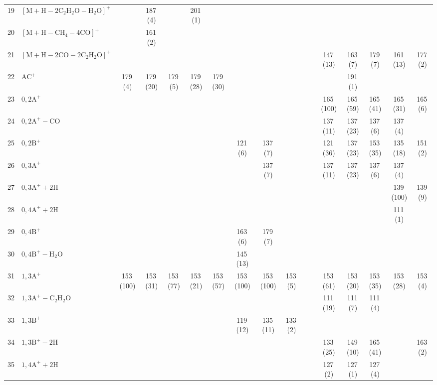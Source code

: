 \documentclass[]{article}
\begin{document}
\begin{table}
{\begin{tabular}{ll|ccccc|ccccc|ccccc}
  19 & $\mathrm{[M{+}H{-}2C_{2}H_{2}O{-}H_{2}O]^+}$ &  & 187\,(4) &  & 201\,(1) &  &  &  &  &  &  &  &  &  &  &  \\ 
  20 & $\mathrm{[M{+}H{-}CH_{4}{-}4CO]^+}$ &  & 161\,(2) &  &  &  &  &  &  &  &  &  &  &  &  &  \\ 
  21 & $\mathrm{[M{+}H{-}2CO{-}2C_{2}H_{2}O]^+}$ &  &  &  &  &  &  &  &  &  &  & 147\,(13) & 163\,(7) & 179\,(7) & 161\,(13) & 177\,(2) \\ 
  22 & $\mathrm{AC^+}$ & 179\,(4) & 179\,(20) & 179\,(5) & 179\,(28) & 179\,(30) &  &  &  &  &  &  & 191\,(1) &  &  &  \\ 
  23 & $\mathrm{0{,}2A^+}$ &  &  &  &  &  &  &  &  &  &  & 165\,(100) & 165\,(59) & 165\,(41) & 165\,(31) & 165\,(6) \\ 
  24 & $\mathrm{0{,}2A^+{-}CO}$ &  &  &  &  &  &  &  &  &  &  & 137\,(11) & 137\,(23) & 137\,(6) & 137\,(4) &  \\ 
  25 & $\mathrm{0{,}2B^+}$ &  &  &  &  &  & 121\,(6) & 137\,(7) &  &  &  & 121\,(36) & 137\,(23) & 153\,(35) & 135\,(18) & 151\,(2) \\ 
  26 & $\mathrm{0{,}3A^+}$ &  &  &  &  &  &  & 137\,(7) &  &  &  & 137\,(11) & 137\,(23) & 137\,(6) & 137\,(4) &  \\ 
  27 & $\mathrm{0{,}3A^+{+}2H}$ &  &  &  &  &  &  &  &  &  &  &  &  &  & 139\,(100) & 139\,(9) \\ 
  28 & $\mathrm{0{,}4A^+{+}2H}$ &  &  &  &  &  &  &  &  &  &  &  &  &  & 111\,(1) &  \\ 
  29 & $\mathrm{0{,}4B^+}$ &  &  &  &  &  & 163\,(6) & 179\,(7) &  &  &  &  &  &  &  &  \\ 
  30 & $\mathrm{0{,}4B^+{-}H_{2}O}$ &  &  &  &  &  & 145\,(13) &  &  &  &  &  &  &  &  &  \\ 
  31 & $\mathrm{1{,}3A^+}$ & 153\,(100) & 153\,(31) & 153\,(77) & 153\,(21) & 153\,(57) & 153\,(100) & 153\,(100) & 153\,(5) &  &  & 153\,(61) & 153\,(20) & 153\,(35) & 153\,(28) & 153\,(4) \\ 
  32 & $\mathrm{1{,}3A^+{-}C_{2}H_{2}O}$ &  &  &  &  &  &  &  &  &  &  & 111\,(19) & 111\,(7) & 111\,(4) &  &  \\ 
  33 & $\mathrm{1{,}3B^+}$ &  &  &  &  &  & 119\,(12) & 135\,(11) & 133\,(2) &  &  &  &  &  &  &  \\ 
  34 & $\mathrm{1{,}3B^+{-}2H}$ &  &  &  &  &  &  &  &  &  &  & 133\,(25) & 149\,(10) & 165\,(41) &  & 163\,(2) \\ 
  35 & $\mathrm{1{,}4A^+{+}2H}$ &  &  &  &  &  &  &  &  &  &  & 127\,(2) & 127\,(1) & 127\,(4) &  &  \\ 

\end{tabular}}
\end{table}
\end{document}
